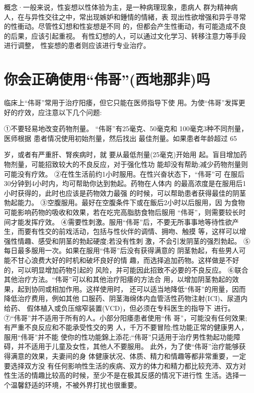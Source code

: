 \documentclass[12pt,UTF8]{ctexbook}
\begin{document}
概念·一般来说，性妄想以性体验为主，是一种病理现象，患病人
群为精神病人，在与异性交往之中，常出现嫉妒和鍾情的情緒，表
现出性欲增强和异乎寻常的性衝动。尽管性幻想和性妄想是不同
的，但都会产生性衝动，有可能造成不良的后果，应该引起重视。
有性幻想的人，可以通过文化学习、转移注意力等手段进行调整，
性妄想的患者则应该进行专业治疗。

\section{你会正确使用“伟哥”(西地那非)吗}

临床上“伟哥”常用于治疗阳痿，但它只能在医师指导下使
用。为使“伟哥”发挥更好的疗效，应注意以下几个问题:

①不要轻易地改变药物剂量。
“伟哥”有25毫克、50毫克和
100毫克3种不同剂量，医师根据
患者情况使用初始剂量，然后找出
最佳剂量。如果患者年龄超过 65

岁，或者有严重肝、腎疾病时，就
要从最低剂量(25毫克)开始用
起。盲目增加药物剂量，可能招致较大的不良反应，对于强化性功
能却没有帮助;减少药物剂量则可能没有疗效。
②在性生活前约1小时服用。在性兴奋状态下，“伟哥”可
在服后30分钟到4小时内，均可帮助你达到勃起。药物在人体内
的最高浓度是在服用后1小时获得的，此时也应该是药物效力最强
的时候，可以帮助患者获得最佳的阴茎勃起能力。
③空腹服用。最好在空腹条件下或在飯后2小时以后服用，因
为食物可能影响药物的吸收和效果，若在吃完高脂肪食物后服用
“伟哥”，则需要较长时间才能发挥疗效。
④需要性刺激。服用“伟哥”后，不要无所事事地等待性欲产
生，而要有性交的前戏活动，包括与性伙伴的调情、拥吻、触摸
等，这样可以增强性情趣、感受和阴茎的勃起硬度;若没有性刺
激，不会引发阴茎的强烈勃起。
⑤每日最多服用一次。如果在服用“伟哥”后没有获得满意的
阴茎勃起，有些男人可能不甘心浪费大好的时机和破坏良好的情
趣，而选择追加药物。这样做是不好的，可以明显增加药物引起的
风险，并可能因此招致不必要的不良反应。
⑥联合其他治疗方法。“伟哥”可以和其他治疗阳痿的方法合
用，以增加阴茎勃起的效果，起到协同或相加作用。这样使用时，
还可以适当地降低“伟哥”的用量，因而降低治疗费用，例如其他
口服药、阴茎海绵体内血管活性药物注射(ICI)、尿道内给药、
假体植入或负压缩窄装置(VCD)，但必须在专科医生的指导下
进行。
⑦“伟哥”并不适用于所有的人。小部分阳痿患者使用“伟
哥”，可能没有任何效果;有严重不良反应和不能承受性交的男
人，千万不要冒险;性功能正常的健康男人，服用“伟哥”并不能
使你的性功能錦上添花;“伟哥”只适用于治疗男性勃起功能障
碍，并不适用于儿童及女性，其他人不要服用。
此外，为了使“伟哥”治疗能够获得满意的效果，夫妻间的身
体健康状况、体质、精力和情趣等都非常重要，一定要选择双方没
有任何影响性生活的疾病、双方的体力和精力都比较充沛、双方对
性生活的情趣比较高的时候，至少不是在极其反感的情况下进行性
生活。选择一个温馨舒适的环境，不被外界打扰也很重要。
\end{document}
